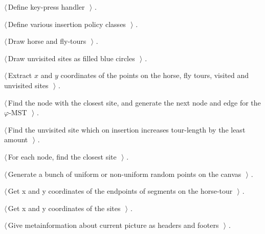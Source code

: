 \documentclass[11.5pt]{report}
\begin{document}
{\begin{list}{}{\setlength{\itemsep}{-\parsep}\setlength{\itemindent}{-\leftmargin}}
\item $\langle\,$Define key-press handler\nobreak\ {\footnotesize {}}$\,\rangle$ {\footnotesize {\NWtxtRefIn} .}
\item $\langle\,$Define various insertion policy classes\nobreak\ {\footnotesize {}}$\,\rangle$ {\footnotesize {\NWtxtRefIn} .}
\item $\langle\,$Draw horse and fly-tours\nobreak\ {\footnotesize {}}$\,\rangle$ {\footnotesize {\NWtxtRefIn} .}
\item $\langle\,$Draw unvisited sites as filled blue circles\nobreak\ {\footnotesize {}}$\,\rangle$ {\footnotesize {\NWtxtRefIn} .}
\item $\langle\,$Extract $x$ and $y$ coordinates of the points on the horse, fly tours, visited and unvisited sites\nobreak\ {\footnotesize {}}$\,\rangle$ {\footnotesize {\NWtxtRefIn} .}
\item $\langle\,$Find the node with the closest site, and generate the next node and edge for the $\varphi$-MST\nobreak\ {\footnotesize {}}$\,\rangle$ {\footnotesize {\NWtxtRefIn} .}
\item $\langle\,$Find the unvisited site which on insertion increases tour-length by the least amount\nobreak\ {\footnotesize {}}$\,\rangle$ {\footnotesize {\NWtxtRefIn} .}
\item $\langle\,$For each node, find the closest site\nobreak\ {\footnotesize {}}$\,\rangle$ {\footnotesize {\NWtxtRefIn} .}
\item $\langle\,$Generate a bunch of uniform or non-uniform random points on the canvas\nobreak\ {\footnotesize {}}$\,\rangle$ {\footnotesize {\NWtxtRefIn} .}
\item $\langle\,$Get x and y coordinates of the endpoints of segments on the horse-tour\nobreak\ {\footnotesize {}}$\,\rangle$ {\footnotesize {\NWtxtRefIn} .}
\item $\langle\,$Get x and y coordinates of the sites\nobreak\ {\footnotesize {}}$\,\rangle$ {\footnotesize {\NWtxtRefIn} .}
\item $\langle\,$Give metainformation about current picture as headers and footers\nobreak\ {\footnotesize {}}$\,\rangle$ {\footnotesize {\NWtxtRefIn} .}

\end{list}}
\end{document}
